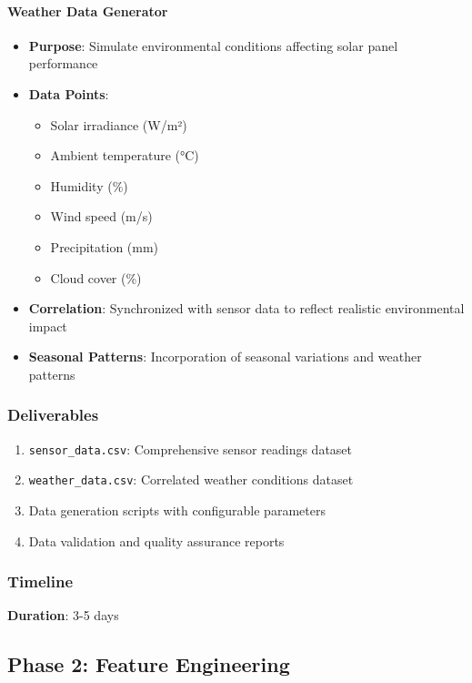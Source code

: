 \documentclass[12pt,a4paper]{article}
\begin{document}
\paragraph{Weather Data Generator}
\begin{itemize}[leftmargin=*]
    \item \textbf{Purpose}: Simulate environmental conditions affecting solar panel performance
    \item \textbf{Data Points}:
    \begin{itemize}
        \item Solar irradiance (W/m²)
        \item Ambient temperature (°C)
        \item Humidity (\%)
        \item Wind speed (m/s)
        \item Precipitation (mm)
        \item Cloud cover (\%)
    \end{itemize}
    \item \textbf{Correlation}: Synchronized with sensor data to reflect realistic environmental impact
    \item \textbf{Seasonal Patterns}: Incorporation of seasonal variations and weather patterns
\end{itemize}

\subsubsection{Deliverables}
\begin{enumerate}
    \item \texttt{sensor\_data.csv}: Comprehensive sensor readings dataset
    \item \texttt{weather\_data.csv}: Correlated weather conditions dataset
    \item Data generation scripts with configurable parameters
    \item Data validation and quality assurance reports
\end{enumerate}

\subsubsection{Timeline}
\textbf{Duration}: 3-5 days

\subsection{Phase 2: Feature Engineering}
\end{document}
